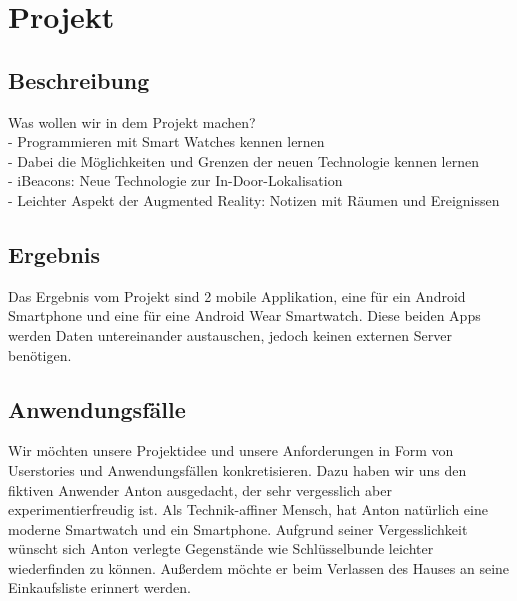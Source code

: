 



\setcounter{secnumdepth}{3}
\setcounter{tocdepth}{2}

\pagestyle{empty}


\tableofcontents
\setcounter{page}{1}

\pagestyle{scrheadings}

\newpage

\section{Projekt}

\subsection{Beschreibung}
Was wollen wir in dem Projekt machen?
\\- Programmieren mit Smart Watches kennen lernen
\\- Dabei die Möglichkeiten und Grenzen der neuen Technologie kennen lernen
\\- iBeacons: Neue Technologie zur In-Door-Lokalisation
\\- Leichter Aspekt der Augmented Reality: Notizen mit Räumen und Ereignissen 

\subsection{Ergebnis}
Das Ergebnis vom Projekt sind 2 mobile Applikation, eine für ein Android Smartphone und eine für eine Android Wear Smartwatch. Diese beiden Apps werden Daten untereinander austauschen, jedoch keinen externen Server benötigen.

\subsection{Anwendungsfälle}
Wir möchten unsere Projektidee und unsere Anforderungen in Form von Userstories und Anwendungsfällen konkretisieren. Dazu haben wir uns den fiktiven Anwender Anton ausgedacht, der sehr vergesslich aber experimentierfreudig ist. Als Technik-affiner Mensch, hat Anton natürlich eine moderne Smartwatch und ein Smartphone. Aufgrund seiner Vergesslichkeit wünscht sich Anton verlegte Gegenstände wie Schlüsselbunde leichter wiederfinden zu können. Außerdem möchte er beim Verlassen des Hauses an seine Einkaufsliste erinnert werden.

